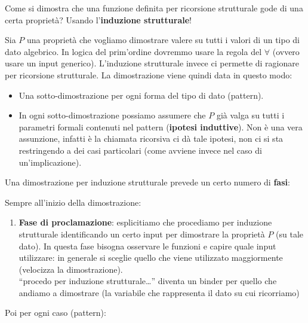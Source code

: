 \documentclass[
  a4paper,
]{article}
\providecommand{\tightlist}{%
  \setlength{\itemsep}{0pt}\setlength{\parskip}{0pt}}
\begin{document}
Come si dimostra che una funzione definita per ricorsione strutturale
gode di una certa proprietà? Usando l'\textbf{induzione strutturale}!

Sia \(P\) una proprietà che vogliamo dimostrare valere su tutti i valori
di un tipo di dato algebrico. In logica del prim'ordine dovremmo usare
la regola del \(\forall\) (ovvero usare un input generico). L'induzione
strutturale invece ci permette di ragionare per ricorsione strutturale.
La dimostrazione viene quindi data in questo modo:

\begin{itemize}
\tightlist
\item
  Una sotto-dimostrazione per ogni forma del tipo di dato (pattern).
\item
  In ogni sotto-dimostrazione possiamo assumere che \(P\) già valga su
  tutti i parametri formali contenuti nel pattern (\textbf{ipotesi
  induttive}). Non è una vera assunzione, infatti è la chiamata
  ricorsiva ci dà tale ipotesi, non ci si sta restringendo a dei casi
  particolari (come avviene invece nel caso di un'implicazione).
\end{itemize}

Una dimostrazione per induzione strutturale prevede un certo numero di
\textbf{fasi}:

Sempre all'inizio della dimostrazione:

\begin{enumerate}
\def\labelenumi{\arabic{enumi}.}
\tightlist
\item
  \textbf{Fase di proclamazione}: esplicitiamo che procediamo per
  induzione strutturale identificando un certo input per dimostrare la
  proprietà \(P\) (su tale dato). In questa fase bisogna osservare le
  funzioni e capire quale input utilizzare: in generale si sceglie
  quello che viene utilizzato maggiormente (velocizza la
  dimostrazione).\\
  ``procedo per induzione strutturale\ldots{}'' diventa un binder per
  quello che andiamo a dimostrare (la variabile che rappresenta il dato
  su cui ricorriamo)
\end{enumerate}

Poi per ogni caso (pattern):
\end{document}
